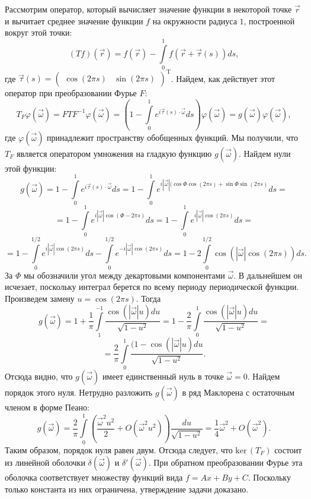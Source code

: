 \documentclass{article}
\begin{document}
Рассмотрим оператор, который вычисляет значение функции в некоторой точке $\vec{r}$ и вычитает среднее значение функции $f$ на окружности радиуса $1$, построенной вокруг этой точки:
$$(Tf) (\vec{r}) = f(\vec{r}) - \int\limits_{0}^{1} f(\vec{r} + \vec{\tau} (s)) ds,$$
где $\vec{\tau} (s) = (\begin{array}{cc} \cos (2\pi s) & \sin (2\pi s) \end{array})^\mathrm{T}$.
Найдем, как действует этот оператор при преобразовании Фурье $F$:
$$T_{F} \varphi (\vec{\omega}) = F T F^{-1} \varphi (\vec{\omega}) = \left(1 - \int\limits_{0}^{1} e^{i \vec{\tau} (s) \cdot \vec{\omega}} ds \right) \varphi (\vec{\omega}) = g(\vec{\omega}) \varphi (\vec{\omega}),$$
где $\varphi (\vec{\omega})$ принадлежит пространству обобщенных функций. Мы получили, что $T_F$ является оператором умножения на гладкую функцию $g(\vec{\omega})$. Найдем нули этой функции:
$$g(\vec{\omega}) =  1 - \int\limits_{0}^{1} e^{i \vec{\tau} (s) \cdot \vec{\omega}} ds = 1 - \int\limits_{0}^{1} e^{i |\vec{\omega}| (\cos \Phi \cos (2\pi s) +\sin \Phi  \sin (2\pi s)}ds = $$
$$ = 1 - \int\limits_{0}^{1} e^{i |\vec{\omega}| \cos (\Phi - 2\pi s)}ds = 1 - \int\limits_{0}^{1} e^{i |\vec{\omega}| \cos (2\pi s)}ds = $$
$$ = 1 - \int\limits_{0}^{1/2} e^{i |\vec{\omega}| \cos (2\pi s)} ds - \int\limits_{0}^{1/2} e^{-i |\vec{\omega}| \cos (2\pi s)}ds = 1 - 2 \int\limits_{0}^{1/2} \cos(|\vec{\omega}| \cos (2\pi s))ds.$$
За $\Phi$ мы обозначили угол между декартовыми компонентами $\vec{\omega}$. В дальнейшем он исчезает, поскольку интеграл берется по всему периоду периодической функции. Произведем замену $u = \cos (2\pi s)$. Тогда
$$g(\vec{\omega}) = 1 + \frac{1}{\pi} \int\limits_{1}^{-1} \frac{\cos(|\vec{\omega}| u) du}{\sqrt{1 - u^2}} = 1 - \frac{2}{\pi} \int\limits_{0}^{1} \frac{\cos(|\vec{\omega}| u) du}{\sqrt{1 - u^2}} = $$
$$ = \frac{2}{\pi} \int\limits_0^1 \frac{(1 - \cos(|\vec{\omega}| u) du}{\sqrt{1 - u^2}}.$$
Отсюда видно, что $g(\vec{\omega})$ имеет единственный нуль в точке $\vec{\omega} = 0$. Найдем порядок этого нуля. Нетрудно разложить $g(\vec{\omega})$ в ряд Маклорена с остаточным членом в форме Пеано:
$$g(\vec{\omega}) = \frac{2}{\pi} \int\limits_0^1 \left(\frac{\vec{\omega}^2u^2}{2} + O(\vec{\omega}^2u^2) \right) \frac{du}{\sqrt{1 - u^2}} = \frac14 \vec{\omega}^2 + O(\vec{\omega}^2).$$
Таким образом, порядок нуля равен двум. Отсюда следует, что $\text{ker}\, (T_F)$ состоит из линейной оболочки $\delta(\vec{\omega})$ и $\delta'(\vec{\omega})$. При обратном преобразовании Фурье эта оболочка соответствует множеству функций вида $f = Ax + By + C$. Поскольку только константа из них ограничена, утверждение задачи доказано.
\end{document}
